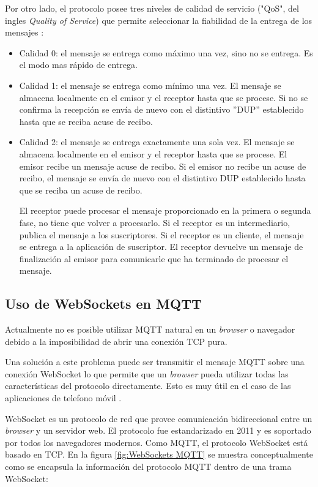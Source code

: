 Por otro lado, el protocolo posee tres niveles de calidad de servicio   ("QoS", del ingles \textit{Quality of Service}) que permite seleccionar la fiabilidad de la entrega de los mensajes \citep{WEBSITE:5}\citep{WEBSITE:28} :

\begin{itemize}
\item Calidad 0: el mensaje se entrega como máximo una vez, sino no se entrega. Es el modo mas rápido de entrega.
\item Calidad 1: el mensaje se entrega como mínimo una vez. El mensaje se almacena localmente en el emisor y el receptor hasta que se procese. Si no se confirma la recepción se envía de nuevo con el distintivo ''DUP'' establecido hasta que se reciba acuse de recibo.
\item Calidad 2: el mensaje se entrega exactamente una sola vez. El mensaje se almacena localmente en el emisor y el receptor hasta que se procese. El emisor recibe un mensaje acuse de recibo. Si el emisor no recibe un acuse de recibo, el mensaje se envía de nuevo con el distintivo DUP establecido hasta que se reciba un acuse de recibo.

El receptor puede procesar el mensaje proporcionado en la primera o segunda fase, no tiene que volver a procesarlo. Si el receptor es un intermediario, publica el mensaje a los suscriptores. Si el receptor es un cliente, el mensaje se entrega a la aplicación de suscriptor. El receptor devuelve un mensaje de finalización al emisor para comunicarle que ha terminado de procesar el mensaje.

\end{itemize}


\label{subsec:WebSockets}
\subsection{Uso de WebSockets en MQTT}

Actualmente no es posible utilizar MQTT natural en un \textit{browser} o navegador debido a la imposibilidad de abrir una conexión TCP pura. 

Una solución a este problema puede ser transmitir el mensaje MQTT sobre una conexión WebSocket lo que permite que un \textit{browser} pueda utilizar todas las características del protocolo directamente. Esto es muy útil en el caso de las aplicaciones de telefono móvil \citep{WEBSITE:6}. 


WebSocket es un protocolo de red que provee comunicación bidireccional entre un \textit{browser} y un servidor web. El protocolo fue estandarizado en 2011 y es soportado por todos los navegadores modernos. Como MQTT, el protocolo WebSocket está basado en TCP. En la figura \ref{fig:WebSockets MQTT} se muestra conceptualmente como se encapsula la información del protocolo MQTT dentro de una trama WebSocket:

